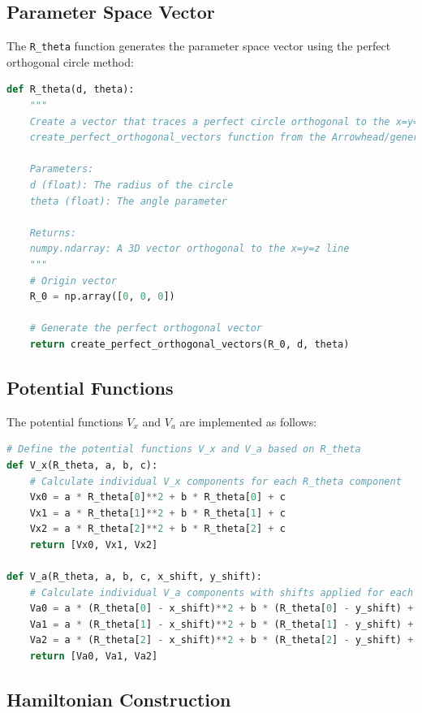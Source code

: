 \documentclass[12pt,a4paper]{article}
\begin{document}
\subsection{Parameter Space Vector}

The \texttt{R\_theta} function generates the parameter space vector using the perfect orthogonal circle method:

\begin{lstlisting}[language=Python, caption=R\_theta function]
def R_theta(d, theta):
    """
    Create a vector that traces a perfect circle orthogonal to the x=y=z line using the
    create_perfect_orthogonal_vectors function from the Arrowhead/generalized package.
    
    Parameters:
    d (float): The radius of the circle
    theta (float): The angle parameter
    
    Returns:
    numpy.ndarray: A 3D vector orthogonal to the x=y=z line
    """
    # Origin vector
    R_0 = np.array([0, 0, 0])
    
    # Generate the perfect orthogonal vector
    return create_perfect_orthogonal_vectors(R_0, d, theta)
\end{lstlisting}

\subsection{Potential Functions}

The potential functions $V_x$ and $V_a$ are implemented as follows:

\begin{lstlisting}[language=Python, caption=Potential functions]
# Define the potential functions V_x and V_a based on R_theta
def V_x(R_theta, a, b, c):
    # Calculate individual V_x components for each R_theta component
    Vx0 = a * R_theta[0]**2 + b * R_theta[0] + c
    Vx1 = a * R_theta[1]**2 + b * R_theta[1] + c
    Vx2 = a * R_theta[2]**2 + b * R_theta[2] + c
    return [Vx0, Vx1, Vx2]

def V_a(R_theta, a, b, c, x_shift, y_shift):
    # Calculate individual V_a components with shifts applied for each R_theta component
    Va0 = a * (R_theta[0] - x_shift)**2 + b * (R_theta[0] - y_shift) + c
    Va1 = a * (R_theta[1] - x_shift)**2 + b * (R_theta[1] - y_shift) + c
    Va2 = a * (R_theta[2] - x_shift)**2 + b * (R_theta[2] - y_shift) + c
    return [Va0, Va1, Va2]
\end{lstlisting}

\subsection{Hamiltonian Construction}
\end{document}
